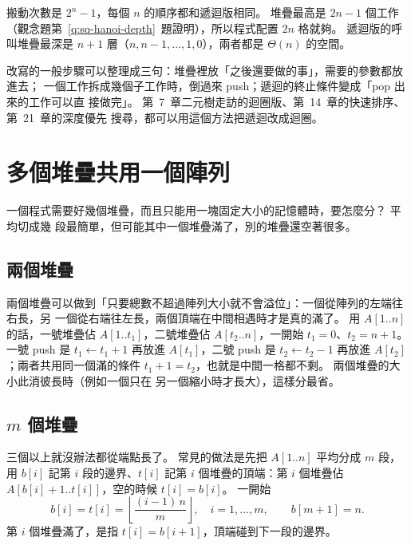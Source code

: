 搬動次數是 $2^n - 1$，每個 $n$ 的順序都和遞迴版相同。 堆疊最高是 $2n - 1$ 個工作
（觀念題第~\ref{q:sq-hanoi-depth}~題證明），所以程式配置 $2n$ 格就夠。 遞迴版的呼叫堆疊最深是 $n + 1$
層（$n, n-1, \ldots, 1, 0$），兩者都是 $\Theta(n)$ 的空間。

改寫的一般步驟可以整理成三句：堆疊裡放「之後還要做的事」，需要的參數都放進去；
一個工作拆成幾個子工作時，倒過來 push；遞迴的終止條件變成「pop 出來的工作可以直
接做完」。 第~7~章二元樹走訪的迴圈版、第~14~章的快速排序、第~21~章的深度優先
搜尋，都可以用這個方法把遞迴改成迴圈。

\section{多個堆疊共用一個陣列}
\label{sec:sq-multi}

一個程式需要好幾個堆疊，而且只能用一塊固定大小的記憶體時，要怎麼分？ 平均切成幾
段最簡單，但可能其中一個堆疊滿了，別的堆疊還空著很多。

\subsection{兩個堆疊}

兩個堆疊可以做到「只要總數不超過陣列大小就不會溢位」：一個從陣列的左端往右長，另
一個從右端往左長，兩個頂端在中間相遇時才是真的滿了。
用 $A[1..n]$ 的話，一號堆疊佔 $A[1..t_1]$，二號堆疊佔 $A[t_2..n]$，一開始
$t_1 = 0$、$t_2 = n + 1$。 一號 push 是 $t_1 \gets t_1 + 1$ 再放進 $A[t_1]$，二號
push 是 $t_2 \gets t_2 - 1$ 再放進 $A[t_2]$；兩者共用同一個滿的條件
$t_1 + 1 = t_2$，也就是中間一格都不剩。 兩個堆疊的大小此消彼長時（例如一個只在
另一個縮小時才長大），這樣分最省。

\subsection{$m$ 個堆疊}

三個以上就沒辦法都從端點長了。 常見的做法是先把 $A[1..n]$ 平均分成 $m$ 段，用
$b[i]$ 記第 $i$ 段的邊界、$t[i]$ 記第 $i$ 個堆疊的頂端：第 $i$ 個堆疊佔
$A[b[i]+1..t[i]]$，空的時候 $t[i] = b[i]$。 一開始
\[
b[i] = t[i] = \left\lfloor \frac{(i - 1)\, n}{m} \right\rfloor, \quad
i = 1, \ldots, m, \qquad b[m+1] = n.
\]
第 $i$ 個堆疊滿了，是指 $t[i] = b[i + 1]$，頂端碰到下一段的邊界。

